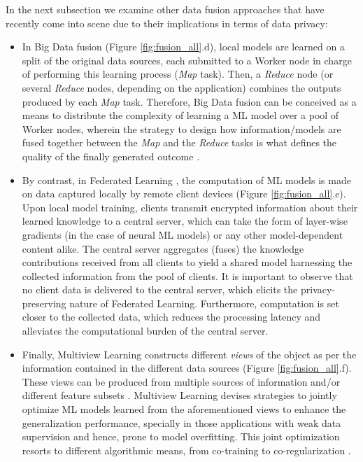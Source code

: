 \documentclass[final]{elsarticle}
\begin{document}
In the next subsection we examine other data fusion approaches that have recently come into scene due to their implications in terms of data privacy:
\begin{itemize}[leftmargin=*]
\item In Big Data fusion (Figure \ref{fig:fusion_all}.d), local models are learned on a split of the original data sources, each submitted to a Worker node in charge of performing this learning process (\emph{Map} task). Then, a \emph{Reduce} node (or several \emph{Reduce} nodes, depending on the application) combines the outputs produced by each \emph{Map} task. Therefore, Big Data fusion can be conceived as a means to distribute the complexity of learning a ML model over a pool of Worker nodes, wherein the strategy to design how information/models are fused together between the \emph{Map} and the \emph{Reduce} tasks is what defines the quality of the finally generated outcome \cite{ramirez2018big}. 
\item By contrast, in Federated Learning \cite{1610.02527,mcmahan2017communication,konevcny2016federated}, the computation of ML models is made on data captured locally by remote client devices (Figure \ref{fig:fusion_all}.e). Upon local model training, clients transmit encrypted information about their learned knowledge to a central server, which can take the form of layer-wise gradients (in the case of neural ML models) or any other model-dependent content alike. The central server aggregates (fuses) the knowledge contributions received from all clients to yield a shared model harnessing the collected information from the pool of clients. It is important to observe that no client data is delivered to the central server, which elicits the privacy-preserving nature of Federated Learning. Furthermore, computation is set closer to the collected data, which reduces the processing latency and alleviates the computational burden of the central server.

\item Finally, Multiview Learning \cite{sun2013survey} constructs different \emph{views} of the object as per the information contained in the different data sources (Figure \ref{fig:fusion_all}.f). These views can be produced from multiple sources of information and/or different feature subsets \cite{zhang2019feature}. Multiview Learning devises strategies to jointly optimize ML models learned from the aforementioned views to enhance the generalization performance, specially in those applications with weak data supervision and hence, prone to model overfitting. This joint optimization resorts to different algorithmic means, from co-training to co-regularization \cite{zhao2017multi}. 
\end{itemize}
\end{document}
